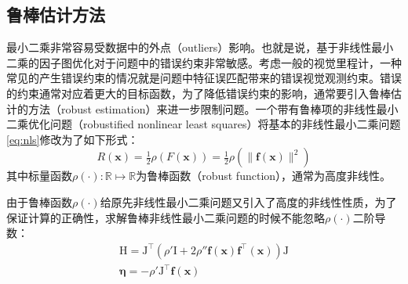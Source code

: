 \subsection{鲁棒估计方法}

最小二乘非常容易受数据中的外点（outliers）影响。也就是说，基于非线性最小二乘的因子图优化对于问题中的错误约束非常敏感。考虑一般的视觉里程计，一种常见的产生错误约束的情况就是问题中特征误匹配带来的错误视觉观测约束。错误的约束通常对应着更大的目标函数，为了降低错误约束的影响，通常要引入鲁棒估计的方法（robust estimation）来进一步限制问题。一个带有鲁棒项的非线性最小二乘优化问题（robustified nonlinear least squares）将基本的非线性最小二乘问题\eqref{eq:nls}修改为了如下形式：
\begin{equation}
    R(\bm{x}) = \tfrac{1}{2} \rho(F(\bm{x}))
              = \tfrac{1}{2} \rho \left( \lVert \bm{f}(\bm{x}) \rVert^2 \right)
\label{eq:rnls}
\end{equation}
其中标量函数$\rho(\cdot):\mathbb{R}\mapsto\mathbb{R}$为鲁棒函数（robust function），通常为高度非线性。

由于鲁棒函数$\rho(\cdot)$给原先非线性最小二乘问题又引入了高度的非线性性质，为了保证计算的正确性，求解鲁棒非线性最小二乘问题的时候不能忽略$\rho(\cdot)$二阶导数\citep{triggs1999bundle}：
\begin{equation}
\begin{gathered}
    \mathrm{H} = \mathrm{J}^\top
                 \left(
                     \rho'\mathrm{I} + 2\rho'' \bm{f}(\bm{x}) \bm{f}^\top(\bm{x})
                 \right)
                 \mathrm{J} \\
    \bm{\eta} = -\rho' \mathrm{J}^\top \bm{f}(\bm{x})
\end{gathered}
\label{eq:rnormal_eq}
\end{equation}


